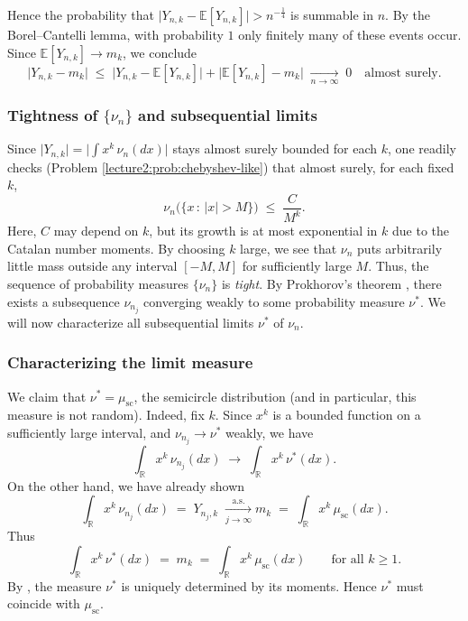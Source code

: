 \documentclass[letterpaper,11pt,oneside,reqno]{book}
\numberwithin{equation}{chapter}  %
\theoremstyle{definition}
\begin{document}
Hence the probability that \(\lvert Y_{n,k} - \mathbb{E}[Y_{n,k}]\rvert > n^{-\frac{1}{4}}\) is summable in \(n\).  By the Borel--Cantelli lemma, with probability \(1\) only finitely many of these events occur.  Since \(\mathbb{E}[Y_{n,k}]\to m_k\), we conclude
\[
  \bigl|Y_{n,k} - m_k\bigr|
  \;\le\;\bigl|Y_{n,k}-\mathbb{E}[Y_{n,k}]\bigr|
  +\bigl|\mathbb{E}[Y_{n,k}]-m_k\bigr|
  \;\xrightarrow[n\to\infty]{}\;0
  \quad
  \text{almost surely.}
\]

\subsubsection{Tightness of \(\{\nu_n\}\) and subsequential limits}
\label{lecture2:subsub:semicircle-tightness}

Since \(\lvert Y_{n,k}\rvert = \bigl|\int x^k\,\nu_n(dx)\bigr|\) stays
almost surely
bounded for each \(k\), one readily checks
(Problem \ref{lecture2:prob:chebyshev-like})
that almost surely, for each fixed \(k\),
\begin{equation}
	\label{lecture2:eq:chebyshev-like}
  \nu_n\bigl(\{x\,:\,|x|>M\}\bigr)
	\;\le\; \frac{C}{M^k}.
\end{equation}
Here, $C$ may depend on $k$, but 
its growth is at most exponential in \(k\)
due to the Catalan number moments.
By choosing \(k\) large, we see that \(\nu_n\) puts
arbitrarily little mass outside any interval
\([-M,M]\) for sufficiently large $M$.  Thus, the
sequence of probability measures
\(\{\nu_n\}\) is \emph{tight}.
By Prokhorov’s theorem \cite[Theorem~25.10]{billingsley1995probability},
there exists a subsequence \(\nu_{n_j}\) converging weakly to some probability measure \(\nu^*\).
We will now characterize all subsequential limits $\nu^*$ of $\nu_n$.

\subsubsection{Characterizing the limit measure}
\label{lecture2:subsub:semicircle-characterization}

We claim that \(\nu^*=\mu_{\mathrm{sc}}\), the semicircle distribution
(and in particular, this measure is not random).
Indeed, fix \(k\).  Since \(x^k\) is a bounded function on a sufficiently large interval, and \(\nu_{n_j}\to\nu^*\) weakly, we have
\[
\int_{\mathbb{R}} x^k\,\nu_{n_j}(dx) \;\to\;\int_{\mathbb{R}} x^k\,\nu^*(dx).
\]
On the other hand, we have already shown
\[
\int_{\mathbb{R}} x^k \, \nu_{n_j}(dx)
   \;=\;
   Y_{n_j,k}
   \;\xrightarrow[j\to\infty]{\text{a.s.}}
   m_k
   \;=\;\int_{\mathbb{R}} x^k\,\mu_{\mathrm{sc}}(dx).
\]
Thus
\[
\int_{\mathbb{R}} x^k\,\nu^*(dx)
   \;=\;
   m_k
   \;=\;
   \int_{\mathbb{R}} x^k\,\mu_{\mathrm{sc}}(dx)
   \qquad
   \text{for all $k\ge1$.}
\]
By , the measure \(\nu^*\) is uniquely
determined by its moments.  Hence \(\nu^*\) must coincide
with \(\mu_{\mathrm{sc}}\).
\end{document}
